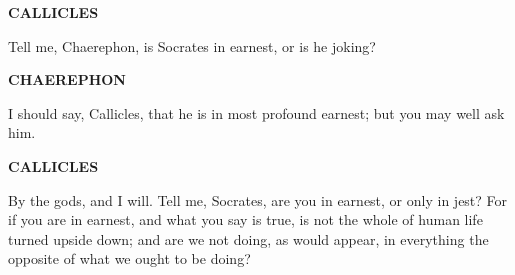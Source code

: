 \documentclass[11pt,letter]{article}
\begin{document}
\par \textbf{CALLICLES}
\par   Tell me, Chaerephon, is Socrates in earnest, or is he joking?

\par \textbf{CHAEREPHON}
\par   I should say, Callicles, that he is in most profound earnest; but you may well ask him.

\par \textbf{CALLICLES}
\par   By the gods, and I will. Tell me, Socrates, are you in earnest, or only in jest? For if you are in earnest, and what you say is true, is not the whole of human life turned upside down; and are we not doing, as would appear, in everything the opposite of what we ought to be doing?
\end{document}

